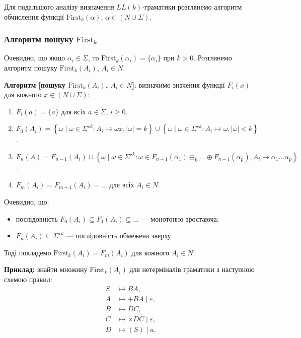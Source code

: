 Для подальшого аналізу визначення $LL(k)$-граматики розглянемо алгоритм обчислення функції $\text{First}_k (\alpha)$, $\alpha \in (N \cup \Sigma)$.

\subsubsection{Алгоритм пошуку $\text{First}_k$}

Очевидно, що якщо $\alpha_i \in \Sigma$, то $\text{First}_k (\alpha_i) = \{\alpha_i\}$ при $k > 0$. Розглянемо алгоритм пошуку $\text{First}_k (A_i)$, $A_i \in N$.\medskip

\textbf{Алгоритм [пошуку $\text{First}_k(A_i)$, $A_i \in N$]}: визначимо значення функції $F_i(x)$ для кожного $x \in (N \cup \Sigma)$: 
\begin{enumerate}
	\item $F_i (a) = \{a\}$ для всіх $a \in \Sigma$, $i \ge 0$.
	\item $F_0(A_i) = \left\{ \omega \mid \omega \in \Sigma^{\star k}: A_i \mapsto \omega x, \vert\omega\vert = k \right\} \cup \left\{ \omega \mid \omega \in \Sigma^{\star k}: A_i \mapsto \omega, \vert\omega\vert < k \right\}$.
	\item $F_n(A) = F_{n - 1}(A_i) \cup \left\{ \omega \mid \omega \in \Sigma^{\star k}: \omega \in F_{n - 1} (\alpha_1) \oplus_k \ldots \oplus F_{n - 1} (\alpha_p), A_i \mapsto \alpha_1 \ldots \alpha_p \right\}$.
	\item $F_m(A_i) = F_{m + 1}(A_i) = \ldots$ для всіх $A_i \in N$.
\end{enumerate}

Очевидно, що:
\begin{itemize}
	\item послідовність $F_0 (A_i) \subseteq F_1(A_i) \subseteq \ldots$ --- монотонно зростаюча;
	\item $F_n(A_i) \subseteq \Sigma^{\star k}$ --- послідовність обмежена зверху.
\end{itemize}

Тоді покладемо $\text{First}_k(A_i) = F_m(A_i)$ для кожного $A_i \in N$.

\textbf{Приклад:} знайти множину $\text{First}_k (A_i)$ для нетерміналів граматики з наступною схемою правил: 
\begin{align*}
	S &\mapsto BA, \\
	A &\mapsto +BA \mid \varepsilon, \\
	B &\mapsto DC, \\
	C &\mapsto \times DC \mid \varepsilon, \\
	D &\mapsto (S) \mid a.
\end{align*}

